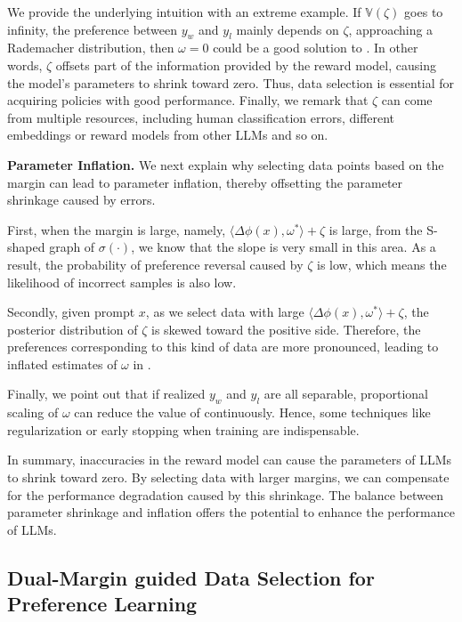 We provide the underlying intuition with an extreme example. If $\mathbb{V}(\zeta)$ goes to infinity, the preference between $y_w$ and $y_l$ mainly depends on $\zeta$,
approaching a Rademacher distribution,
then $\omega=0$ could be a good solution to . 
In other words, $\zeta$ offsets part of the information provided by the reward model, causing the model's parameters to shrink toward zero. 
Thus, data selection is essential for acquiring policies with good performance.
Finally, we remark that $\zeta$ can come from multiple resources, including human classification errors, different embeddings or reward models from other LLMs and so on.

\textbf{Parameter Inflation.}
We next explain why selecting data points based on the margin can lead to parameter inflation, thereby offsetting the parameter shrinkage caused by errors.

First, when the margin is large, namely, $\langle \Delta\phi(x),\omega^*\rangle+\zeta$ is large, from the S-shaped graph of $\sigma(\cdot)$, we know that the slope is very small in this area. As a result, the probability of preference reversal caused by $\zeta$ is low, which means the likelihood of incorrect samples is also low.

Secondly, given prompt $x$, as we select data with large $\langle \Delta\phi(x),\omega^*\rangle+\zeta$, the posterior distribution of $\zeta$ is skewed toward the positive side. Therefore, the preferences corresponding to this kind of data are more pronounced, leading to inflated estimates of $\omega$ in .

Finally, we point out that if realized $y_w$ and $y_l$ are all separable, proportional scaling of $\omega$ can reduce the value of  continuously. Hence, some techniques like regularization or early stopping when training are indispensable.

In summary, inaccuracies in the reward model can cause the parameters of LLMs to shrink toward zero. By selecting data with larger margins, we can compensate for the performance degradation caused by this shrinkage. The balance between parameter shrinkage and inflation offers the potential to enhance the performance of LLMs.


\subsection{Dual-Margin guided Data Selection for Preference Learning}

